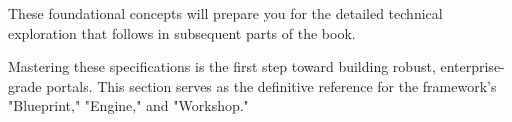 These foundational concepts will prepare you for the detailed technical exploration that follows in subsequent parts of the book.

Mastering these specifications is the first step toward building robust, enterprise-grade portals. This section serves as the definitive reference for the framework's "Blueprint," "Engine," and "Workshop."
